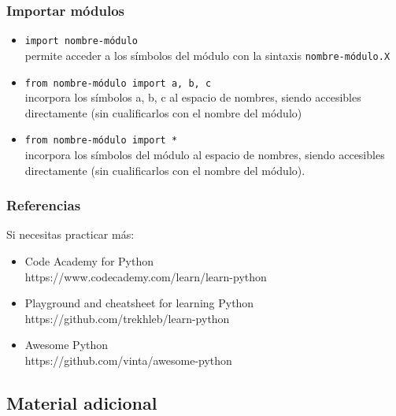 \begin{frame}[fragile]
\frametitle{Importar módulos}

\begin{itemize}
\item \verb|import nombre-módulo               | \\permite acceder a los
  símbolos del módulo con la sintaxis \verb|nombre-módulo.X|
\item \verb|from nombre-módulo import a, b, c  | \\incorpora
  los símbolos a, b, c al espacio de nombres, siendo accesibles
  directamente (sin cualificarlos con el nombre del módulo)
\item \verb|from nombre-módulo import *        | \\incorpora los
  símbolos del módulo al espacio de nombres, siendo accesibles
  directamente (sin cualificarlos con el nombre del módulo).
\end{itemize}
\end{frame}


\begin{frame}
\frametitle{Referencias}

Si necesitas practicar más:

\begin{itemize}
\item Code Academy for Python \\ https://www.codecademy.com/learn/learn-python
\item Playground and cheatsheet for learning Python \\ https://github.com/trekhleb/learn-python
\item Awesome Python \\ https://github.com/vinta/awesome-python
\end{itemize}
\end{frame}


\subsection{Material adicional}


